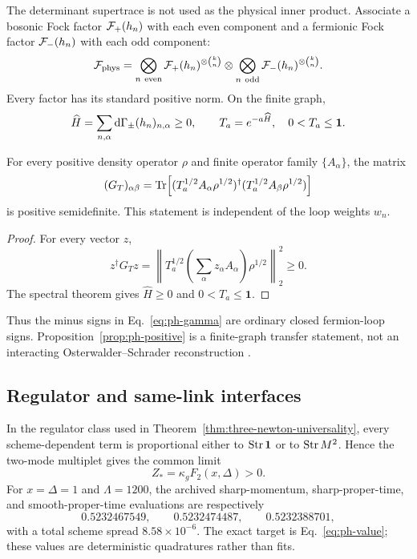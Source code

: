 The determinant supertrace is not used as the physical inner product.
Associate a bosonic Fock factor \(\mathcal F_+(h_n)\) with each even component and a
fermionic Fock factor \(\mathcal F_-(h_n)\) with each odd component:
\begin{equation}
 \mathcal F_{\rm phys}
 =\bigotimes_{n\ {\rm even}}
   \mathcal F_+(h_n)^{\otimes\binom{k}{n}}
 \otimes
 \bigotimes_{n\ {\rm odd}}
   \mathcal F_-(h_n)^{\otimes\binom{k}{n}} .
 \label{eq:ph-fock}
\end{equation}
Every factor has its standard positive norm.  On the finite graph,
\begin{equation}
 \widehat H=\sum_{n,\alpha}
 \mathrm d\Gamma_\pm(h_n)_{n,\alpha}\geq0,\qquad
 T_a=e^{-a\widehat H},\quad 0<T_a\leq\mathbf1 .
 \label{eq:ph-transfer}
\end{equation}

\begin{proposition}
\label{prop:ph-positive}
For every positive density operator \(\rho\) and finite operator family
\(\{A_\alpha\}\), the matrix
\begin{equation}
 (G_T)_{\alpha\beta}
 =\operatorname{Tr}\!\left[
 (T_a^{1/2}A_\alpha\rho^{1/2})^\dagger
 (T_a^{1/2}A_\beta\rho^{1/2})\right]
 \label{eq:ph-gram}
\end{equation}
is positive semidefinite.  This statement is independent of the loop
weights \(w_n\).
\end{proposition}

\begin{proof}
For every vector \(z\),
\[
 z^\dagger G_Tz
 =\left\|T_a^{1/2}
 \left(\sum_\alpha z_\alpha A_\alpha\right)\rho^{1/2}\right\|_2^2
 \geq0.
\]
The spectral theorem gives \(\widehat H\geq0\) and \(0<T_a\leq\mathbf1\).
\end{proof}

Thus the minus signs in Eq.~\eqref{eq:ph-gamma} are ordinary closed
fermion-loop signs.  Proposition~\ref{prop:ph-positive} is a finite-graph
transfer statement, not an interacting Osterwalder--Schrader
reconstruction \cite{OsterwalderSchrader1973}.

\subsection{Regulator and same-link interfaces}

In the regulator class used in
Theorem~\ref{thm:three-newton-universality}, every scheme-dependent term is
proportional either to \(\operatorname{Str}\mathbf1\) or to \(\operatorname{Str} M^2\).  Hence the
two-mode multiplet gives the common limit
\begin{equation}
 Z_*=\kappa_g F_2(x,\Delta)>0 .
 \label{eq:ph-zstar}
\end{equation}
For \(x=\Delta=1\) and \(\Lambda=1200\), the archived sharp-momentum,
sharp-proper-time, and smooth-proper-time evaluations are respectively
\[
 0.5232467549,\qquad 0.5232474487,\qquad 0.5232388701,
\]
with a total scheme spread \(8.58\times10^{-6}\).  The exact target is
Eq.~\eqref{eq:ph-value}; these values are deterministic quadratures rather
than fits.

